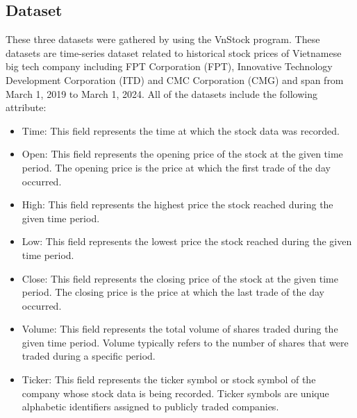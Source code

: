 \documentclass{ieeeojies}
\begin{document}
\subsection{Dataset}
These three datasets were gathered by using the VnStock program. These datasets are time-series dataset related to historical stock prices of Vietnamese big tech company including FPT Corporation (FPT), Innovative Technology Development Corporation (ITD) and CMC Corporation (CMG) and span from March 1, 2019 to March 1, 2024. All of the datasets include the following attribute:
\begin{itemize}
\item Time: This field represents the time at which the stock data was recorded.
\item Open: This field represents the opening price of the stock at the given time period. The opening price is the price at which the first trade of the day occurred.
\item High: This field represents the highest price the stock reached during the given time period.
\item Low: This field represents the lowest price the stock reached during the given time period.
\item Close: This field represents the closing price of the stock at the given time period. The closing price is the price at which the last trade of the day occurred.
\item Volume: This field represents the total volume of shares traded during the given time period. Volume typically refers to the number of shares that were traded during a specific period.
\item Ticker: This field represents the ticker symbol or stock symbol of the company whose stock data is being recorded. Ticker symbols are unique alphabetic identifiers assigned to publicly traded companies.
\end{itemize}
\end{document}
